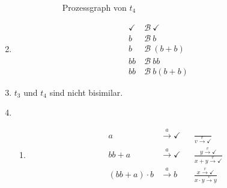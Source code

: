 \documentclass[a4paper]{scrartcl}
\newcommand{\too}{\longrightarrow}
\begin{document}
\begin{enumerate}
\begin{figure}[h]
\begin{subfigure}{0.45\textwidth}
                \caption{Prozessgraph von $t_4$}
                \label{fig:t4}
            \end{subfigure}
            \caption{}
            \label{fig:t3-4}
        \end{figure}

    \item
        \begin{equation}
            \begin{split}
                \checkmark \ &\mathcal{B}\  \checkmark \\
                b \ &\mathcal{B}\  b \\
                b \ &\mathcal{B}\  (b + b) \\
                bb \ &\mathcal{B}\  bb \\
                bb \ &\mathcal{B}\  b(b + b)
            \end{split}
        \end{equation}

    \item
        $t_3$ und $t_4$ sind nicht bisimilar.

    \item
        \begin{enumerate}
            \item
                \begin{align}
                        a &\stackrel{a}{\too} \checkmark & &\frac{}{v \stackrel{v}{\too} \checkmark} \\
                        bb + a &\stackrel{a}{\too} \checkmark & &\frac{y \stackrel{v}{\too} \checkmark}{x + y \stackrel{v}{\too} \checkmark} \\
                        (bb + a) \cdot b &\stackrel{a}{\too} b & &\frac{x \stackrel{v}{\too} \checkmark}{x \cdot y \stackrel{v}{\too} y}
                \end{align}


\end{enumerate}
\end{enumerate}
\end{document}
